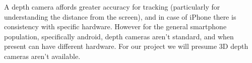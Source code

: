 A depth camera affords greater accuracy for tracking (particularly for understanding the distance from the screen), and in case of iPhone there is consistency with specific hardware. 
However for the general smartphone population, specifically android, depth cameras aren't standard, and when present can have different hardware. 
For our project we will presume 3D depth cameras aren't available.

